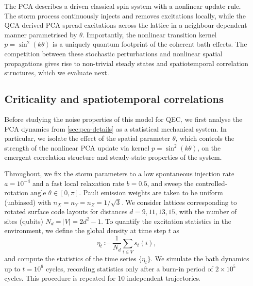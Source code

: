 The PCA describes a driven classical spin system with a nonlinear update rule. The storm process continuously injects and removes excitations locally, while the QCA-derived PCA spread excitations across the lattice in a neighbour-dependent manner parametrised by \(\theta\). Importantly, the nonlinear transition kernel $p = \sin^2(k\theta)$ is a uniquely quantum footprint of the coherent bath effects. The competition between these stochastic perturbations and nonlinear spatial propagations gives rise to non-trivial steady states and spatiotemporal correlation structures, which we evaluate next.

\subsection{Criticality and spatiotemporal correlations}\label{sec:qca-stat-mech}
Before studying the noise properties of this model for QEC, we first analyse the PCA dynamics from \cref{sec:pca-details} as a statistical mechanical system. In particular, we isolate the effect of the spatial parameter \(\theta\), which controls the strength of the nonlinear PCA update via kernel \(p = \sin^2(k\theta)\), on the emergent correlation structure and steady-state properties of the system.

Throughout, we fix the storm parameters to a low spontaneous injection rate $a=10^{-4}$ and a fast local relaxation rate \(b=0.5\), and sweep the controlled-rotation angle \(\theta \in [0, \pi]\). Pauli emission weights are taken to be uniform (unbiased) with \(n_X = n_Y = n_Z = 1/\sqrt{3}\). We consider lattices corresponding to rotated surface code layouts for distances \(d=9, 11, 13, 15\), with the number of sites (qubits) \(N_d = |V| = 2d^2 - 1\). To quantify the excitation statistics in the environment, we define the global density at time step \(t\) as
\begin{equation}
    \eta_t \coloneq \frac{1}{N_d}\sum_{i\in V} s_t(i),
\end{equation}
and compute the statistics of the time series $\{\eta_t\}$. We simulate the bath dynamics up to $t=10^6$ cycles, recording statistics only after a burn-in period of $2 \times 10^5$ cycles. This procedure is repeated for 10 independent trajectories.

